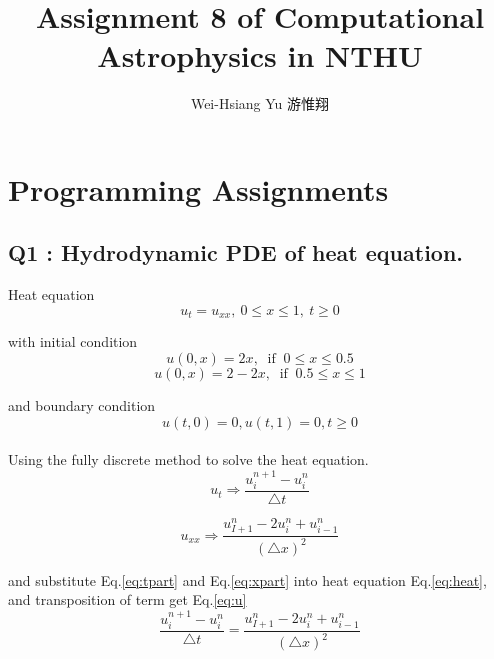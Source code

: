 \documentclass{article}
\title{Assignment 8 of Computational Astrophysics in NTHU}
\author{Wei-Hsiang Yu 游惟翔}
\affil{Department of Physics, National Tsing Hua University, Hsinchu, Taiwan}
\begin{document}
\begin{CJK}{UTF8}{bsmi}
\maketitle
\end{CJK}


\section{Programming Assignments}

\subsection*{Q1 : Hydrodynamic PDE of heat equation.}


Heat equation
\begin{equation}
    u_{t}=u_{xx},\ 0\leq x\leq 1,\ t\geq 0
    \label{eq:heat}
\end{equation}

with initial condition
\begin{equation}
    u(0,x)= 2x,\ \mbox{ if }\ 0\leq x \leq 0.5
    \label{eq:ic}
\end{equation}
$$
    u(0,x)= 2-2x,\ \mbox{ if }\ 0.5\leq x \leq 1
$$

and boundary condition
\begin{equation}
    u(t,0)= 0, u(t,1)= 0, t\geq 0
    \label{eq:bc}
\end{equation}
\\

Using the fully discrete method to solve the heat equation.
\begin{equation}
    u_{t}\Rightarrow \frac{u_i^{n+1}-u_i^{n}}{\triangle t}
    \label{eq:tpart}
\end{equation}

\begin{equation}
    u_{xx}\Rightarrow \frac{u_{I+1}^{n}-2u_i^{n}+u_{i-1}^{n}}{(\triangle x)^2}
    \label{eq:xpart}
\end{equation}

and substitute Eq.\ref{eq:tpart} and Eq.\ref{eq:xpart} into heat equation Eq.\ref{eq:heat}, and transposition of term get Eq.\ref{eq:u}
$$
    \frac{u_i^{n+1}-u_i^{n}}{\triangle t}
    =
    \frac{u_{I+1}^{n}-2u_i^{n}+u_{i-1}^{n}}{(\triangle x)^2}
$$
\end{document}
